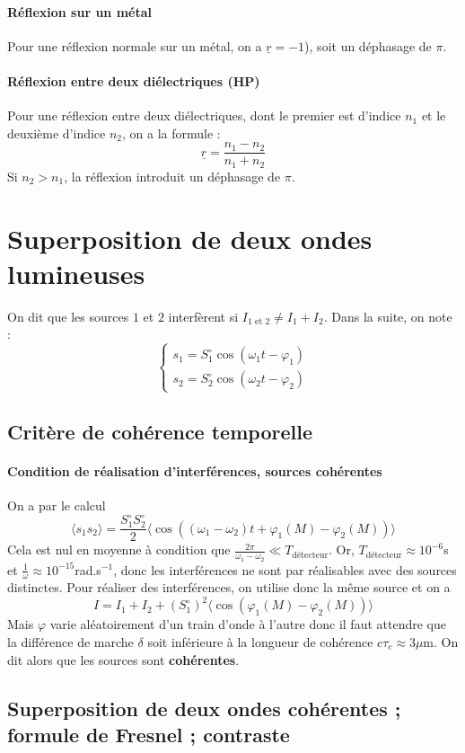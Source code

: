 \documentclass[french]{book}
\theoremstyle{plain}
\theoremstyle{definition}
\theoremstyle{remark}
\newcommand{\inv}{^{-1}}
\begin{document}
\paragraph{Réflexion sur un métal} Pour une réflexion normale sur un métal, on a $\underline{r}=-1$), soit un déphasage de $\pi$.
\paragraph{Réflexion entre deux diélectriques (HP)} Pour une réflexion entre deux diélectriques, dont le premier est d'indice $n_1$ et le deuxième d'indice $n_2$, on a la formule : $$\underline{r}=\frac{n_1-n_2}{n_1+n_2}$$ Si $n_2>n_1$, la réflexion introduit un déphasage de $\pi$.
\section{Superposition de deux ondes lumineuses}
On dit que les sources $1$ et $2$ interfèrent si $I_{\text{1 et 2}}\ne I_1+I_2$. Dans la suite, on note : $$\begin{cases}
	s_1=S_1^\circ\cos(\omega_1 t-\varphi_1) \\
	s_2=S_2^\circ\cos(\omega_2 t-\varphi_2)
\end{cases}$$
\subsection{Critère de cohérence temporelle}
\paragraph{Condition de réalisation d'interférences, sources cohérentes} On a par le calcul $$\langle s_1s_2\rangle =\frac{S_1^\circ S_2^\circ}{2}\bigg\langle\cos\left((\omega_1-\omega_2)t+\varphi_1(M)-\varphi_2(M)\right)\bigg\rangle$$ Cela est nul en moyenne à condition que $\displaystyle\frac{2\pi}{\omega_1-\omega_2}\ll T_\text{détecteur}$. Or, $T_\text{détecteur}\approx 10^{-6}$s et $\displaystyle\frac{1}{\omega}\approx 10^{-15}$rad.s$\inv$, donc les interférences ne sont par réalisables avec des sources distinctes. Pour réaliser des interférences, on utilise donc la même source et on a $$I=I_1+I_2+(S_1^\circ)^2\bigg\langle\cos\left(\varphi_1(M)-\varphi_2(M)\right)\bigg\rangle$$ Mais $\varphi$ varie aléatoirement d'un train d'onde à l'autre donc il faut attendre que la différence de marche $\delta$ soit inférieure à la longueur de cohérence $c\tau_c\approx 3\mu$m. On dit alors que les sources sont \textbf{cohérentes}.
\subsection{Superposition de deux ondes cohérentes ; formule de Fresnel ; contraste}
\end{document}
